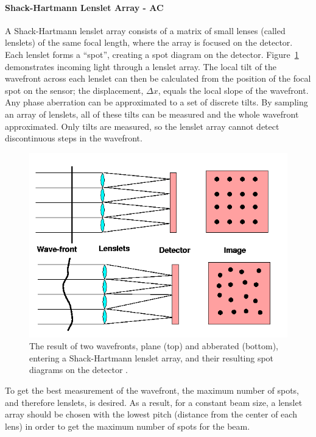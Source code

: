 \documentclass[12pt]{article}
\begin{document}
\paragraph{Shack-Hartmann Lenslet Array - AC} \label{sec:payload_sh}

A Shack-Hartmann lenslet array consists of a matrix of small lenses (called lenslets) of the same focal length, where the array is focused on the detector. Each lenslet forms a “spot”, creating a spot diagram on the detector. Figure~\ref{fig:lenslet_array} demonstrates incoming light through a lenslet array. The local tilt of the wavefront across each lenslet can then be calculated from the position of the focal spot on the sensor; the displacement, $\Delta x$, equals the local slope of the wavefront. Any phase aberration can be approximated to a set of discrete tilts. By sampling an array of lenslets, all of these tilts can be measured and the whole wavefront approximated. Only tilts are measured, so the lenslet array cannot detect discontinuous steps in the wavefront.

\begin{figure}[ht]
\centering
  \includegraphics[width=5in]{images/payload_SH.png}
\caption{The result of two wavefronts, plane (top)
  and abberated (bottom), entering a Shack-Hartmann lenslet array, and their
  resulting spot diagrams on the detector \cite{ctio_AO}.}
\label{fig:lenslet_array}
\end{figure}

To get the best measurement of the wavefront, the maximum number of spots, and therefore lenslets, is desired. As a result, for a constant beam size, a lenslet array should be chosen with the lowest pitch (distance from the center of each lens) in order to get the maximum number of spots for the beam. 
\end{document}
